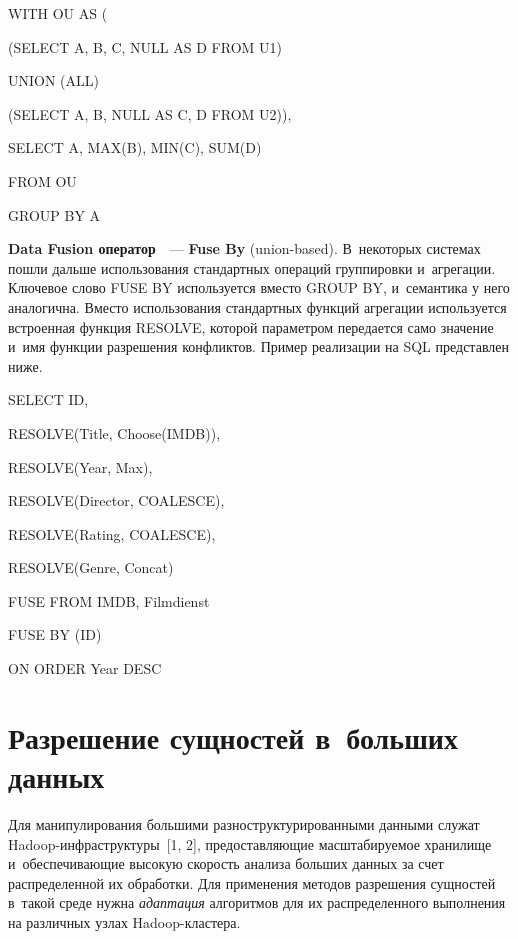 \begin{multicols}{2}
\noindent
{\sf  WITH OU AS (}

\noindent
{\sf   \hspace*{3pt}(SELECT A, B, C, NULL AS D FROM U1)}

\noindent
{\sf         \hspace*{6pt}UNION (ALL)}

\noindent
{\sf    \hspace*{3pt}(SELECT A, B, NULL AS C, D FROM U2)),}

\noindent
{\sf   SELECT A, MAX(B), MIN(C), SUM(D)}

\noindent
{\sf   FROM OU}

\noindent
{\sf   GROUP BY A}

\textbf{Data Fusion оператор}~\cite{13-vov}~--- \textbf{Fuse By} (union-based).
В~некоторых системах пошли дальше использования стандартных операций
группировки и~агрегации. Ключевое слово FUSE BY используется вместо GROUP BY,
и~семантика у него аналогична. Вмес\-то использования стандартных функций агрегации
используется встроенная функция RESOLVE, которой параметром передается само значение
и~имя функции разрешения конфликтов. Пример реализации на SQL представлен ниже.

\noindent
{\sf SELECT ID,}

\noindent
{\sf  \hspace*{3pt}RESOLVE(Title, Choose(IMDB)),}

\noindent
{\sf   \hspace*{3pt}RESOLVE(Year, Max),}

\noindent
{\sf  \hspace*{3pt}RESOLVE(Director, COALESCE),}

\noindent
{\sf   \hspace*{3pt}RESOLVE(Rating, COALESCE),}

\noindent
{\sf   \hspace*{3pt}RESOLVE(Genre, Concat)}

\noindent
{\sf   FUSE FROM IMDB, Filmdienst}

\noindent
{\sf   FUSE BY (ID)}

\noindent
{\sf   ON ORDER Year DESC}

  \section{Разрешение сущностей в~больших данных}

  Для манипулирования большими разноструктурированными данными служат
  Hadoop-инф\-ра\-струк\-ту\-ры~[1, 2], предоставляющие масштабируемое хранилище
и~обеспечивающие высокую \mbox{скорость} анализа больших данных за счет распределенной их
обработки. Для применения методов разрешения сущностей в~такой среде нужна
\textit{адаптация} алгоритмов для их распределенного выполнения на различных узлах
Hadoop-клас\-тера.


\end{multicols}
